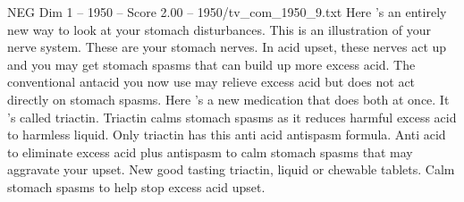 \begin{textsample}{NEG Dim 1 – 1950 – Score 2.00 – 1950/tv\_com\_1950\_9.txt}  \label{ex:f1_neg_089}
Here 's an entirely new way to look at your stomach disturbances.
This is an illustration of your nerve system.
These are your stomach nerves.
In acid upset, these nerves act up and you may get stomach spasms that can build up more excess acid.
The conventional antacid you now use may relieve excess acid but does not act directly on stomach spasms.
Here 's a new medication that does both at once.
It 's called triactin.
Triactin calms stomach spasms as it reduces harmful excess acid to harmless liquid.
Only triactin has this anti acid antispasm formula.
Anti acid to eliminate excess acid plus antispasm to calm stomach spasms that may aggravate your upset.
New good tasting triactin, liquid or chewable tablets.
Calm stomach spasms to help stop excess acid upset.

\end{textsample}
